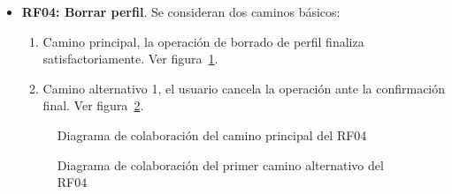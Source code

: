 \begin{itemize}
	\FloatBarrier
	\item \textbf{RF04: Borrar perfil}. Se consideran dos caminos básicos: 
	\begin{enumerate}
		\item Camino principal, la operación de borrado de perfil finaliza satisfactoriamente. Ver figura~\ref{fig:diagramaColaboracion_RF04_1}.
		\item Camino alternativo 1, el usuario cancela la operación ante la confirmación final. Ver figura~\ref{fig:diagramaColaboracion_RF04_2}.
	\end{enumerate}
	\begin{figure} [!htb]
		\centering
		\caption{Diagrama de colaboración del camino principal del RF04}
		\label{fig:diagramaColaboracion_RF04_1}
	\end{figure}
	\begin{figure} [!htb]
		\centering
		\caption{Diagrama de colaboración del primer camino alternativo del RF04}
		\label{fig:diagramaColaboracion_RF04_2}
	\end{figure}
	

\end{itemize}
